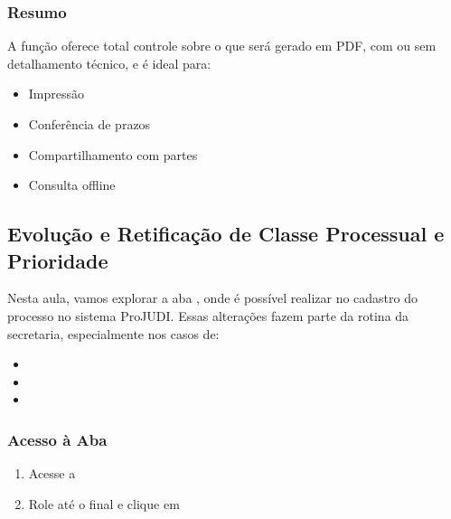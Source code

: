 \documentclass[letterpaper,10pt,brazil]{sphinxmanual}
\begin{document}
\subsubsection{Resumo}
\label{\detokenize{projud_18_exportarprocesso:resumo}}
\sphinxAtStartPar
A função  oferece total controle sobre o que será gerado em PDF, com ou sem detalhamento técnico, e é ideal para:
\begin{itemize}
\item {} 
\sphinxAtStartPar
Impressão

\item {} 
\sphinxAtStartPar
Conferência de prazos

\item {} 
\sphinxAtStartPar
Compartilhamento com partes

\item {} 
\sphinxAtStartPar
Consulta offline

\end{itemize}

\sphinxstepscope


\subsection{Evolução e Retificação de Classe Processual e Prioridade}
\label{\detokenize{projud_19_evolucao_retificacao:evolucao-e-retificacao-de-classe-processual-e-prioridade}}\label{\detokenize{projud_19_evolucao_retificacao::doc}}
\sphinxAtStartPar
Nesta aula, vamos explorar a aba , onde é possível realizar  no cadastro do processo no sistema ProJUDI. Essas alterações fazem parte da rotina da secretaria, especialmente nos casos de:
\begin{itemize}
\item {} 
\sphinxAtStartPar
{}

\item {} 
\sphinxAtStartPar
{}

\item {} 
\sphinxAtStartPar
{}

\end{itemize}


\subsubsection{Acesso à Aba}
\label{\detokenize{projud_19_evolucao_retificacao:acesso-a-aba}}\begin{enumerate}
%
\item {} 
\sphinxAtStartPar
Acesse a 

\item {} 
\sphinxAtStartPar
Role até o final e clique em 

\end{enumerate}
\end{document}
